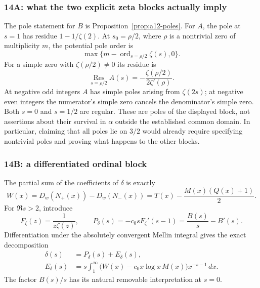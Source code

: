 \subsubsection{14A: what the two explicit zeta blocks actually imply}
\label{subsubsec:a12-A-poles}
The pole statement for $B$ is Proposition~\ref{prop:a12-poles}.
For $A$, the pole at $s=1$ has residue $1-1/\zeta(2)$.
At $s_0=\rho/2$, where $\rho$ is a nontrivial zero of multiplicity $m$,
the potential pole order is
\begin{equation}
\label{eq:a12-A-order}
\max\{m-\operatorname{ord}_{s=\rho/2}\zeta(s),0\}.
\end{equation}
For a simple zero with $\zeta(\rho/2)\ne0$ its residue is
\begin{equation}
\label{eq:a12-A-residue}
\operatorname*{Res}_{s=\rho/2}A(s)
=-\frac{\zeta(\rho/2)}{2\zeta'(\rho)}.
\end{equation}
At negative odd integers $A$ has simple poles arising from $\zeta(2s)$;
at negative even integers the numerator's simple zero cancels the
denominator's simple zero. Both $s=0$ and $s=1/2$ are regular.
These are poles of the displayed block, not assertions about their
survival in $\alpha$ outside the established common domain.
In particular, claiming that all poles lie on $3/2$ would already require
specifying nontrivial poles and proving what happens to the other blocks.

\subsubsection{14B: a differentiated ordinal block}
\label{subsubsec:a12-delta-model}
The partial sum of the coefficients of $\delta$ is exactly
\begin{equation}
\label{eq:a12-W-pole}
W(x)=D_w(N_+(x))-D_w(N_-(x))
=T(x)-\frac{M(x)(Q(x)+1)}2.
\end{equation}
For $\Re s>2$, introduce
\begin{equation}
\label{eq:a12-Pdelta}
F_\zeta(z)=\frac1{z\zeta(z)},\qquad
P_\delta(s)=-c_0sF_\zeta'(s-1)=\frac{B(s)}s-B'(s).
\end{equation}
Differentiation under the absolutely convergent Mellin integral gives the
exact decomposition
\begin{align}
\delta(s)&=P_\delta(s)+E_\delta(s),\label{eq:a12-delta-split}\\
E_\delta(s)&=s\int_1^\infty
\bigl(W(x)-c_0x\log x\,M(x)\bigr)x^{-s-1}\,dx.
\label{eq:a12-Edelta}
\end{align}
The factor $B(s)/s$ has its natural removable interpretation at $s=0$.

